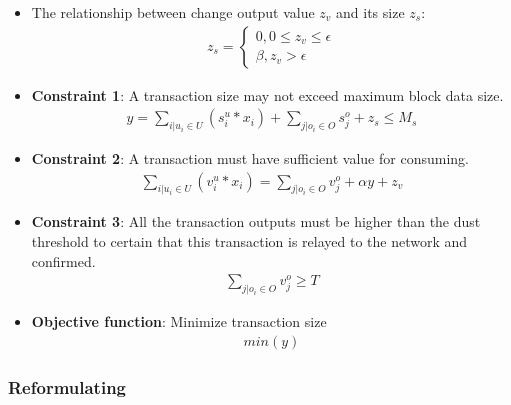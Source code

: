 \begin{itemize}
  \item The relationship between change output value $z_v$ and its size $z_s$:
  \begin{align*}
  z_s =
    \begin{cases}
      0, 0 \leq z_v \leq \epsilon \\
      \beta, z_v > \epsilon
    \end{cases}
  \end{align*}

  \item \textbf{Constraint 1}: A transaction size may not exceed maximum block data size.
  \begin{align*}
y = \sum\limits_{i|u_i \in U} (s_i^u * x_i) + \sum\limits_{j|o_i \in O} s_j^o + z_s \leq M_s
  \end{align*}

  \item \textbf{Constraint 2}: A transaction must have sufficient value for consuming.
  \begin{align*}
\sum\limits_{i|u_i \in U} (v_i^u * x_i) = \sum\limits_{j|o_i \in O} v_j^o + \alpha y + z_v
  \end{align*}

  \item \textbf{Constraint 3}: All the transaction outputs must be higher than the dust threshold to certain that this transaction is relayed to the network and confirmed.
  \begin{align*}
\sum\limits_{j|o_i \in O} v_j^o \geq T
  \end{align*}

  \item \textbf{Objective function}: Minimize transaction size
  \begin{align*}
min(y)
  \end{align*}

\end{itemize}

\subsubsection{Reformulating}

